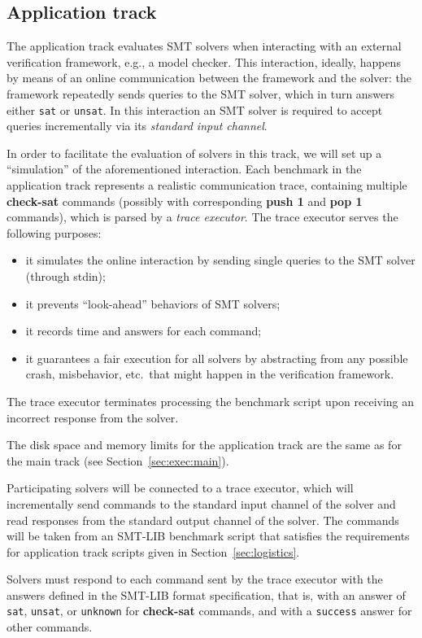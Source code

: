 \documentclass[12pt]{article}
\newcommand{\akey}[1]{\textbf{#1}}
\begin{document}
\subsection{Application track}

The application track evaluates SMT solvers when interacting with an
external verification framework, e.g., a model checker. This
interaction, ideally, happens by means of an online communication
between the framework and the solver: the framework repeatedly sends
queries to the SMT solver, which in turn answers either \texttt{sat}
or \texttt{unsat}.  In this interaction an SMT solver is required to
accept queries incrementally via its \emph{standard input channel}.

In order to facilitate the evaluation of solvers in this track, we
will set up a ``simulation'' of the aforementioned interaction.  Each
benchmark in the application track represents a realistic
communication trace, containing multiple \akey{check-sat} commands
(possibly with corresponding \akey{push 1} and \akey{pop 1} commands),
which is parsed by a \emph{trace executor}. The trace executor serves
the following purposes:
\begin{itemize}
\item it simulates the online interaction by sending single queries to
  the SMT solver (through stdin);
\item it prevents ``look-ahead'' behaviors of SMT solvers;
\item it records time and answers for each command;
\item it guarantees a fair execution for all solvers by abstracting
  from any possible crash, misbehavior, etc.\ that might happen in the
  verification framework.
\end{itemize}
%
The trace executor terminates processing the benchmark script upon
receiving an incorrect response from the solver.

The disk space and memory limits for the application track are the
same as for the main track (see Section~\ref{sec:exec:main}).

%
Participating solvers will be connected to a trace executor, which
will incrementally send commands to the standard input channel of the
solver and read responses from the standard output channel of the
solver.  The commands will be taken from an SMT-LIB benchmark script
that satisfies the requirements for application track scripts given in
Section~\ref{sec:logistics}.

Solvers must respond to each command sent by the trace executor with
the answers defined in the SMT-LIB format specification, that is, with
an answer of \texttt{sat}, \texttt{unsat}, or \texttt{unknown} for
\akey{check-sat} commands, and with a \texttt{success} answer for
other commands.
\end{document}
